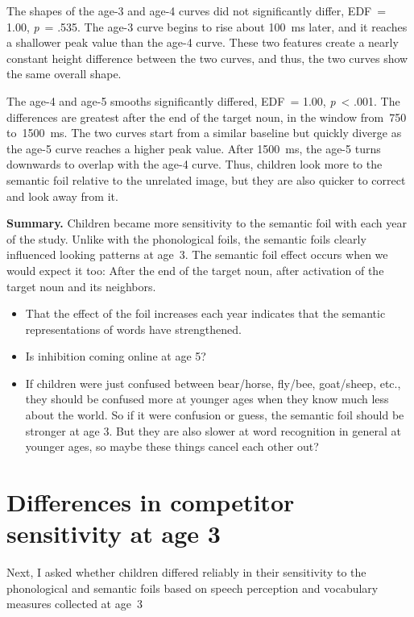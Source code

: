 \documentclass [11pt, proquest] {uwthesis}[2015/03/03]
\providecommand{\tightlist}{%
  \setlength{\itemsep}{0pt}\setlength{\parskip}{0pt}}
\begin{document}
The shapes of the age-3 and age-4 curves did not significantly differ,
EDF~= 1.00, \emph{p}~= .535. The age-3 curve begins to rise about 100~ms
later, and it reaches a shallower peak value than the age-4 curve. These
two features create a nearly constant height difference between the two
curves, and thus, the two curves show the same overall shape.

The age-4 and age-5 smooths significantly differed, EDF~= 1.00,
\emph{p}~\textless{} .001. The differences are greatest after the end of
the target noun, in the window from~750 to~1500~ms. The two curves start
from a similar baseline but quickly diverge as the age-5 curve reaches a
higher peak value. After 1500~ms, the age-5 turns downwards to overlap
with the age-4 curve. Thus, children look more to the semantic foil
relative to the unrelated image, but they are also quicker to correct
and look away from it.

\textbf{Summary.} Children became more sensitivity to the semantic foil
with each year of the study. Unlike with the phonological foils, the
semantic foils clearly influenced looking patterns at age~3. The
semantic foil effect occurs when we would expect it too: After the end
of the target noun, after activation of the target noun and its
neighbors.
\begin{itemize}
\tightlist
\item
  That the effect of the foil increases each year indicates that the
  semantic representations of words have strengthened.
\item
  Is inhibition coming online at age 5?
\item
  If children were just confused between bear/horse, fly/bee,
  goat/sheep, etc., they should be confused more at younger ages when
  they know much less about the world. So if it were confusion or guess,
  the semantic foil should be stronger at age 3. But they are also
  slower at word recognition in general at younger ages, so maybe these
  things cancel each other out?
\end{itemize}
\section{Differences in competitor sensitivity at age
3}\label{differences-in-competitor-sensitivity-at-age-3}

Next, I asked whether children differed reliably in their sensitivity to
the phonological and semantic foils based on speech perception and
vocabulary measures collected at age~3
\end{document}
